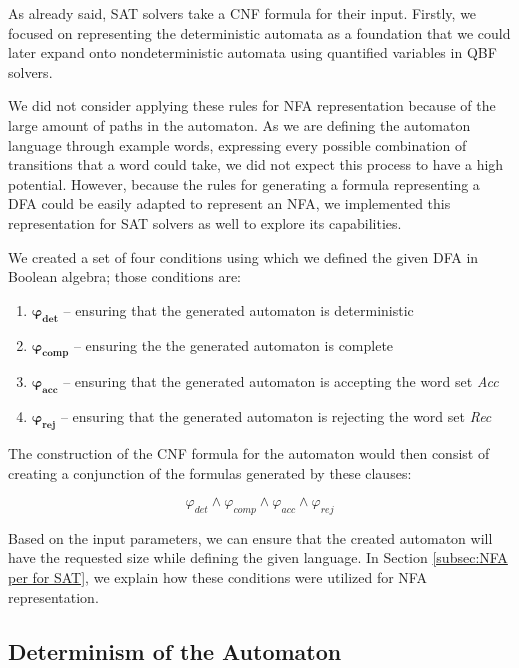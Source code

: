 As already said, SAT solvers take a CNF formula for their input. Firstly, we focused on representing the deterministic automata as a foundation that we could later expand onto nondeterministic automata using quantified variables in QBF solvers.

We did not consider applying these rules for NFA representation because of the large amount of paths in the automaton. As we are defining the automaton language through example words, expressing every possible combination of transitions that a word could take, we did not expect this process to have a high potential. However,  because the rules for generating a formula representing a DFA could be easily adapted to represent an NFA, we implemented this representation for SAT solvers as well to explore its capabilities.

We created a set of four conditions using which we defined the given DFA in Boolean algebra; those conditions are:

\begin{enumerate}
    \item $\boldsymbol{\varphi_{det}}$ -- ensuring that the generated automaton is deterministic
    \item $\boldsymbol{\varphi_{comp}}$ -- ensuring the the generated automaton is complete
    \item $\boldsymbol{\varphi_{acc}}$ -- ensuring that the generated automaton is accepting the word set \textit{Acc}
    \item $\boldsymbol{\varphi_{rej}}$ -- ensuring that the generated automaton is rejecting the word set \textit{Rec}
\end{enumerate}

The construction of the CNF formula for the automaton would then consist of creating a conjunction of the formulas generated by these clauses:

\begin{equation*}
    \varphi_{det} \land \varphi_{comp} \land \varphi_{acc} \land \varphi_{rej}
\end{equation*}

Based on the input parameters, we can ensure that the created automaton will have the requested size while defining the given language. In Section \ref{subsec:NFA per for SAT}, we explain how these conditions were utilized for NFA representation.

\subsection{Determinism of the Automaton}

